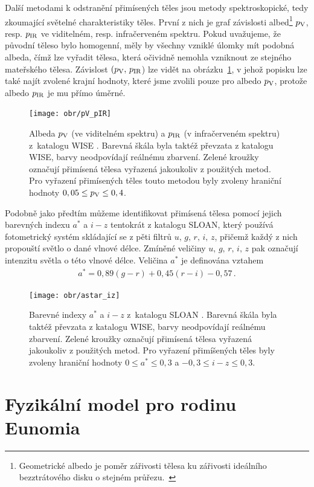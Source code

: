 \documentclass[A4paper, 12pt, oneside]{book}
\begin{document}
Další metodami k odstranění přimísených těles jsou metody spektroskopické, tedy zkoumající světelné charakteristiky těles. První z nich je graf závislosti albed\footnote{Geometrické albedo je poměr zářivosti tělesa ku zářivosti ideálního bezztrátového disku o stejném průřezu.~\cite{fmt}} $p_{\rm V}$, resp. $p_{\rm IR}$ ve viditelném, resp. infračerveném spektru. Pokud uvažujeme, že původní těleso bylo homogenní, měly by všechny vzniklé úlomky mít podobná albeda, čímž lze vyřadit tělesa, která očividně nemohla vzniknout ze stejného mateřského tělesa. Závislost $(p_{\rm V},\,p_{\rm IR}$) lze vidět na obrázku~\ref{fig:pV_pIR}, v jehož popisku lze také najít zvolené krajní hodnoty, které jsme zvolili pouze pro albedo $p_{\rm V}$, protože albedo $p_{\rm IR}$ je mu přímo úměrné.

\begin{figure}
	\centering
	\texttt{[image: obr/pV\_pIR]}
	\caption{Albeda $p_{\rm V}$ (ve viditelném spektru) a $p_{\rm IR}$ (v infračerveném spektru) z~katalogu WISE \cite{nugent15}. Barevná škála byla taktéž převzata z katalogu WISE, barvy neodpovídají reálnému zbarvení. Zelené kroužky označují přimísená tělesa vyřazená jakoukoliv z použitých metod. Pro vyřazení přimísených těles touto metodou byly zvoleny hraniční hodnoty $0,05 \leq p_{\rm V} \leq 0,4$.}
	\label{fig:pV_pIR}
\end{figure}

Podobně jako předtím můžeme identifikovat přimísená tělesa pomocí jejich barevných indexu $a^*$ a $i-z$ tentokrát z katalogu SLOAN, který používá fotometrický systém skládající se z pěti filtrů $u,\,g,\,r,\,i,\,z$, přičemž každý z nich propouští světlo o dané vlnové délce. Zmíněné veličiny 
$u,\,g,\,r,\,i,\,z$ pak označují intenzitu světla o této vlnové délce. Veličina $a^*$ je definována vztahem~\cite{ivezic01}
\begin{align}
	a^ *= 0,89 (g - r) + 0,45 (r - i) - 0,57\,.
\end{align}
\begin{figure}
	\centering
	\texttt{[image: obr/astar\_iz]}
	\caption{Barevné indexy $a^*$ a $i-z$ z~katalogu SLOAN \cite{ivezic01}. Barevná škála byla taktéž převzata z katalogu WISE, barvy neodpovídají reálnému zbarvení. Zelené kroužky označují přimísená tělesa vyřazená jakoukoliv z použitých metod. Pro vyřazení přimíšených těles byly zvoleny hraniční hodnoty $0\leq a^* \leq 0,3$ a $-0,3\leq i-z \leq 0,3$.}
	\label{fig:astar_iz}
\end{figure}
\pagebreak

\section{Fyzikální model pro rodinu Eunomia}
\end{document}
